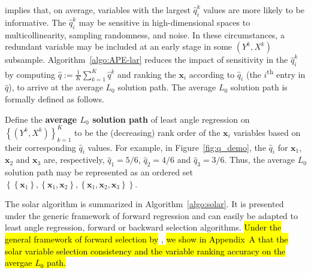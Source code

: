 \documentclass[11pt,review,authoryear]{elsarticle}
\begin{document}
\citet[Theorem 2]{zhang09} implies that, on average, variables with the largest $\widehat{q}^k_i$ values are more likely to be informative. The $\widehat{q}^k_i$ may be sensitive in high-dimensional spaces to multicollinearity, sampling randomness, and noise. In these circumstances, a redundant variable may be included at an early stage in some $\left( Y^k, X^k \right)$ subsample. Algorithm~\ref{algo:APE-lar} reduces the impact of sensitivity in the $\widehat{q}^k_i$ by computing $\widehat{q} := \frac{1}{K} \sum_{k=1}^{K} \widehat{q}^k$ and ranking the $\mathbf{x}_i$ according to $\widehat{q}_i$ (the $i$\textsuperscript{th} entry in $\widehat{q}$), to arrive at the average $L_0$ solution path. The average $L_0$ solution path is formally defined as follows.


\begin{definition}
  Define the \textbf{average $L_0$ solution path} of least angle regression on $\left\{ \left( Y^k, X^k \right) \right\}_{k=1}^{K}$ to be the (decreasing) rank order of the $\mathbf{x}_i$ variables based on their corresponding $\widehat{q}_i$ values. For example, in Figure~\ref{fig:q_demo}, the $\widehat{q}_i$ for $\mathbf{x}_1$, $\mathbf{x}_2$ and $\mathbf{x}_3$ are, respectively, $\widehat{q}_1 = 5/6$, $\widehat{q}_2 = 4/6$ and $\widehat{q}_3 = 3/6$. Thus, the average $L_0$ solution path may be represented as an ordered set $\left\{ \left\{ \mathbf{x}_1 \right\}, \left\{ \mathbf{x}_1, \mathbf{x}_2 \right\}, \left\{ \mathbf{x}_1, \mathbf{x}_2, \mathbf{x}_3 \right\} \right\}$.
  \label{def:L_0_solution_path}
\end{definition}


The solar algorithm is summarized in Algorithm~\ref{algo:solar}. It is presented under the generic framework of forward regression and can easily be adapted to least angle regression, forward or backward selection algorithms. \hl{Under the general framework of forward selection by} \citet{zhang09}, \hl{we show in Appendix~A that the solar variable selection consistency and the variable ranking accuracy on the avergae $L_0$ path.}

\end{document}
